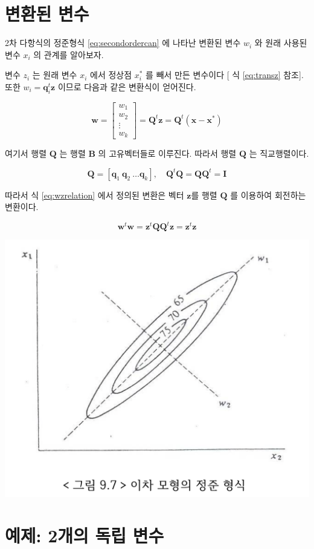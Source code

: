 \documentclass[
]{book}
\newcommand{\bm}[1]{\boldsymbol{\mathbf{#1}}}
\theoremstyle{definition}
\theoremstyle{definition}
\theoremstyle{definition}
\theoremstyle{definition}
\theoremstyle{remark}
\begin{document}
\hypertarget{uxbcc0uxd658uxb41c-uxbcc0uxc218}{%
\section{변환된 변수}\label{uxbcc0uxd658uxb41c-uxbcc0uxc218}}

2차 다항식의 정준형식 \eqref{eq:secondordercan} 에 나타난 변환된 변수 \(w_i\) 와 원래 사용된
변수 \(x_i\) 의 관계를 알아보자.

변수 \(z_i\) 는 원래 변수 \(x_i\) 에서 정상점 \(x_i^*\) 를 빼서 만든 변수이다 {[} 식 \eqref{eq:transz} 참조{]}. 또한 \(w_i = {\bm q}_i^t \bm z\) 이므로 다음과 같은 변환식이 얻어진다.

\begin{equation}
\bm w =
\begin{bmatrix}
w_1 \\
w_2 \\
\vdots \\
w_k
\end{bmatrix}
= \bm Q^t \bm z  = \bm Q^t (\bm x -\bm x^*)
\label{eq:wzrelation}
\end{equation}

여기서 행렬 \(\bm Q\) 는 행렬 \(\bm B\) 의 고유벡터들로 이루진다. 따라서 행렬 \(\bm Q\) 는 직교행렬이다.

\[ \bm Q = [ \bm q_1~ \bm q_2 ~ \dots \bm q_k], \quad  \bm Q^t \bm Q = \bm Q \bm Q^t = \bm I \]

따라서 식 \eqref{eq:wzrelation} 에서 정의된 변환은 벡터 \(\bm z\)를 행렬 \(\bm Q\) 를 이용하여 회전하는 변환이다.

\[ \bm w^t \bm w = \bm z^t  \bm Q \bm Q^t \bm z =  \bm z^t  \bm z \]

\begin{center}\includegraphics[width=0.6\linewidth]{myimages/canonical} \end{center}

\hypertarget{uxc608uxc81c-2uxac1cuxc758-uxb3c5uxb9bd-uxbcc0uxc218}{%
\section{예제: 2개의 독립 변수}\label{uxc608uxc81c-2uxac1cuxc758-uxb3c5uxb9bd-uxbcc0uxc218}}
\end{document}
